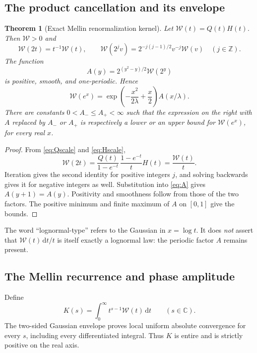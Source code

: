 \documentclass[11pt,letterpaper]{article}
\numberwithin{equation}{section}
\newtheorem{theorem}{Theorem}[section]
\theoremstyle{definition}
\theoremstyle{remark}
\newcommand{\C}{\mathbb C}
\newcommand{\Z}{\mathbb Z}
\newcommand{\W}{\mathcal W}
\newcommand{\dd}{\,\mathrm d}
\begin{document}
\subsection{The product cancellation and its envelope}
\begin{theorem}[Exact Mellin renormalization kernel]\label{thm:kernel}
Let $\W(t)=Q(t)H(t)$. Then $\W>0$ and
\begin{equation}\label{eq:Wscale}
 \W(2t)=t^{-1}\W(t),\qquad
 \W(2^jv)=2^{-j(j-1)/2}v^{-j}\W(v)\quad(j\in\Z).
\end{equation}
The function
\begin{equation}\label{eq:A}
 A(y)=2^{(y^2-y)/2}\W(2^y)
\end{equation}
is positive, smooth, and one-periodic. Hence
\begin{equation}\label{eq:lognormalW}
 \W(e^x)=\exp\!\left(-\frac{x^2}{2\lambda}+\frac x2\right)A(x/\lambda).
\end{equation}
There are constants $0<A_-\le A_+<\infty$ such that the expression on the
right with $A$ replaced by $A_-$ or $A_+$ is respectively a lower or an
upper bound for $\W(e^x)$, for every real $x$.
\end{theorem}
\begin{proof}
From \eqref{eq:Qscale} and \eqref{eq:Hscale},
\[
 \W(2t)=\frac{Q(t)}{1-e^{-t}}\,
         \frac{1-e^{-t}}tH(t)=\frac{\W(t)}t.
\]
Iteration gives the second identity for positive integers $j$, and solving
backwards gives it for negative integers as well.
Substitution into \eqref{eq:A} gives $A(y+1)=A(y)$.
Positivity and smoothness follow from those of the two factors.
The positive minimum and finite maximum of $A$ on $[0,1]$ give the bounds.
\end{proof}

The word ``lognormal-type'' refers to the Gaussian in $x=\log t$.
It does \emph{not} assert that $\W(t)\dd t/t$ is itself exactly a lognormal
law: the periodic factor $A$ remains present.

\subsection{The Mellin recurrence and phase amplitude}
Define
\begin{equation}\label{eq:Kdef}
 K(s)=\int_0^\infty t^{s-1}\W(t)\dd t\qquad(s\in\C).
\end{equation}
The two-sided Gaussian envelope proves local uniform absolute convergence
for every $s$, including every differentiated integral. Thus $K$ is entire
and is strictly positive on the real axis.
\end{document}
